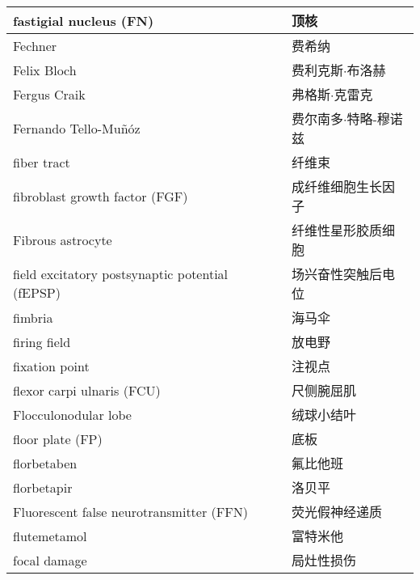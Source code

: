 \begin{longtable}{lll}
	\midrule
	fastigial nucleus (FN)     &&  顶核  \\
	
	\midrule
	Fechner     &&  费希纳  \\
	
	\midrule
	Felix Bloch     &&  费利克斯$\cdot$布洛赫  \\
	
	\midrule
	Fergus Craik     &&  弗格斯$\cdot$克雷克  \\
	
	\midrule
	Fernando Tello-Muñóz     &&  费尔南多$\cdot$特略-穆诺兹  \\
	
	\midrule
	fiber tract     &&  纤维束  \\
	
	\midrule
	fibroblast growth factor (FGF)    &&  成纤维细胞生长因子  \\
	
	\midrule
	Fibrous astrocyte     &&  纤维性星形胶质细胞  \\
	
	\midrule
	field excitatory postsynaptic potential (fEPSP)     &&  场兴奋性突触后电位  \\
	
	\midrule
	fimbria     &&  海马伞  \\
	
	\midrule
	firing field     &&  放电野  \\
	
	\midrule
	fixation point     &&  注视点  \\
	
	\midrule
	flexor carpi ulnaris (FCU)     &&  尺侧腕屈肌  \\
	
	\midrule
	Flocculonodular lobe     &&  绒球小结叶  \\
	
	\midrule
	floor plate (FP)    &&  底板  \\
	
	\midrule
	florbetaben    &&  氟比他班  \\
	
	\midrule
	florbetapir    &&  洛贝平  \\
	
	\midrule
	Fluorescent false neurotransmitter (FFN)    &&  荧光假神经递质  \\
	
	\midrule
	flutemetamol    &&  富特米他  \\
	
	\midrule
	focal damage     &&  局灶性损伤  \\
	

\end{longtable}

